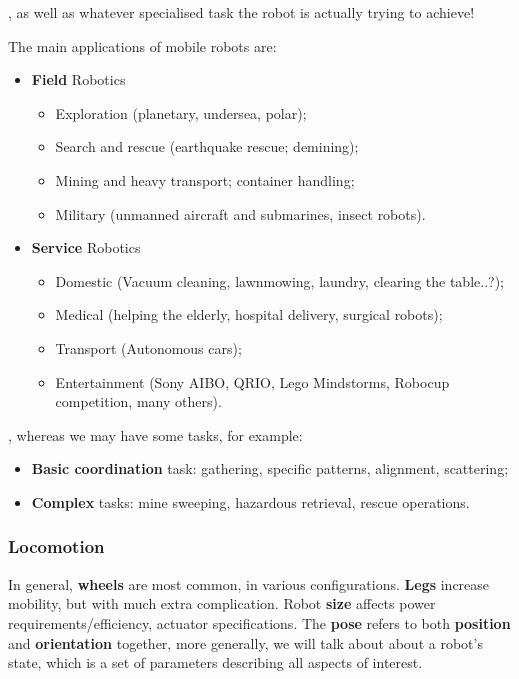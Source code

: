 , as well as whatever specialised task the robot is actually trying to achieve!

The main applications of mobile robots are:
\begin{itemize}
    \item \textbf{Field} Robotics
    \begin{itemize}
        \item Exploration (planetary, undersea, polar);
        \item Search and rescue (earthquake rescue; demining);
        \item Mining and heavy transport; container handling;
        \item Military (unmanned aircraft and submarines, insect robots).
    \end{itemize}
    \item \textbf{Service} Robotics
    \begin{itemize}
        \item Domestic (Vacuum cleaning, lawnmowing, laundry, clearing the table..?);
        \item Medical (helping the elderly, hospital delivery, surgical robots);
        \item Transport (Autonomous cars);
        \item Entertainment (Sony AIBO, QRIO, Lego Mindstorms, Robocup competition, many others).
    \end{itemize}
\end{itemize}

, whereas we may have some tasks, for example:
\begin{itemize}
    \item \textbf{Basic coordination} task: gathering, specific patterns, alignment, scattering;
    \item \textbf{Complex} tasks: mine sweeping, hazardous retrieval, rescue operations.
\end{itemize}

\subsubsection{Locomotion}
In general, \textbf{wheels} are most common, in various configurations. \textbf{Legs} increase mobility, but with much extra complication. Robot \textbf{size} affects power requirements/efficiency, actuator specifications. The \textbf{pose} refers to both \textbf{position} and \textbf{orientation} together, more generally, we will talk about about a robot’s state, which is a set of parameters describing all aspects of interest.

